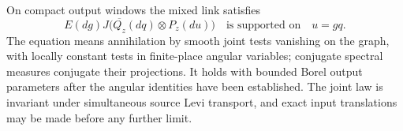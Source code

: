 \begin{proposition}
\label{prop:transfer-residue-graph}
On compact output windows the mixed link satisfies
\begin{equation}
 E(dg)J\bigl(\overline{Q_z}(dq)\otimes P_z(du)\bigr)
 \quad\text{is supported on}\quad u=gq.
 \label{eq:input-6}
\end{equation}
The equation means annihilation by smooth joint tests vanishing on
the graph, with locally constant tests in finite-place angular
variables; conjugate spectral measures conjugate their projections.
It holds with bounded Borel output parameters after the angular
identities have been established. The joint law is invariant under
simultaneous source Levi transport, and exact input translations may
be made before any further limit.
\end{proposition}

